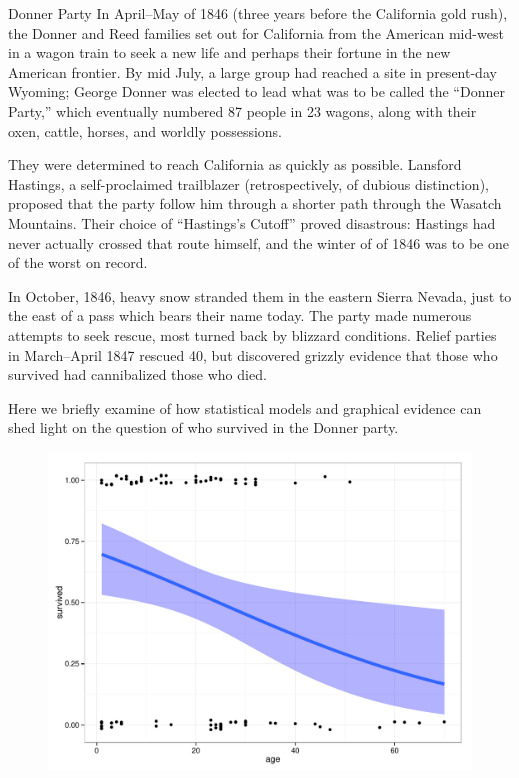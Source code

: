 \documentclass[10pt,krantz2]{krantz}\usepackage[]{graphicx}\usepackage[]{color}
\newenvironment{knitrout}{}{} %
\renewenvironment{knitrout}{\small\renewcommand{\baselinestretch}{.85}}{} %
\begin{document}
\begin{Example}[donner0]{Donner Party}
In April--May of 1846 (three years before the California gold rush),
the Donner and Reed families set out for California from the American mid-west
in a wagon train to seek a new life and perhaps their fortune in the new
American frontier.
By mid July, a large group had reached a site
in present-day Wyoming;  George Donner was elected to lead what was
to be called the ``Donner Party,'' which eventually numbered 87 people
in 23 wagons, along with their oxen, cattle, horses, and worldly possessions.

They were determined to reach California as quickly as possible.
Lansford Hastings, a self-proclaimed trailblazer (retrospectively,
of dubious distinction), proposed that the party follow him through
a shorter path through the Wasatch Mountains.  Their choice
of ``Hastings's Cutoff'' proved disastrous: Hastings had never
actually crossed that route himself, and the winter of of 1846 was to
be one of the worst on record.

In October, 1846, heavy snow stranded them in the eastern Sierra
Nevada, just to the east of a pass which bears their name today.
The party made numerous attempts to seek rescue, most turned back
by blizzard conditions. Relief parties in March--April 1847 rescued
40, but discovered grizzly evidence that those who survived had
cannibalized those who died.

Here we briefly examine of how statistical models and
graphical evidence can shed light on the question of
who survived in the Donner party.

\begin{knitrout}
\color{fgcolor}\begin{figure}[!htbp]

\centerline{\includegraphics[width=.7\textwidth]{ch01/fig/donner0-1} }


\end{figure}
\end{knitrout}
\end{Example}
\end{document}
